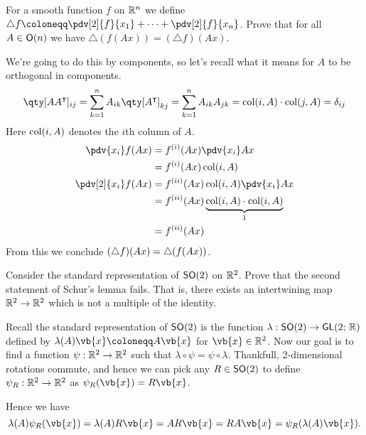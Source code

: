\documentclass[
	pages,
	boxes,
	color=WildStrawberry
]{homework}
\begin{document}
\begin{problem}
For a smooth function $f$ on $\mathbb{R}^n$ we define $\triangle f \defeq \pdv[2]{f}{x_1} + \cdots + \pdv[2]{f}{x_n}$. Prove that for all $A \in \mathsf{O}(n)$ we have $\triangle (f(Ax)) = (\triangle f)(Ax)$.
\end{problem}

\begin{solution}
	We're going to do this by components, so let's recall what it means for $A$ to be orthogonal in components.
	\begin{equation*}
		\qty[AA^{\intercal}]_{ij} = \sum_{k = 1}^{n}A_{ik}\qty[A^\intercal]_{kj} = \sum_{k = 1}^{n}A_{ik}A_{jk} = \col{i}{A}\cdot \col{j}{A} = \delta_{ij}
	\end{equation*}
	Here $\operatorname{col}(i, A)$ denotes the $i$th column of $A$.
	\begin{align*}
		\pdv{x_i}f(Ax)    & = f^{(i)}(Ax)\pdv{x_i}Ax                                 \\
		                  & = f^{(i)}(Ax)\col{i}{A}                                  \\
		\pdv[2]{x_i}f(Ax) & = f^{(ii)}(Ax)\col{i}{A}\pdv{x_i}Ax                      \\
		                  & = f^{(ii)}(Ax)\underbrace{\col{i}{A}\cdot\col{i}{A}}_{1} \\
		                  & = f^{(ii)}(Ax)
	\end{align*}
	From this we conclude $(\triangle{f})(Ax) = \triangle{(f(Ax))}$.
\end{solution}

\begin{problem}
Consider the standard representation of $\mathsf{SO}(2)$ on $\mathbb{R}^2$. Prove that the second statement of Schur's lemma fails. That is, there exists an intertwining map $\mathbb{R}^2 \to \mathbb{R}^2$ which is not a multiple of the identity.
\end{problem}

\begin{solution}
	Recall the standard representation of $\mathsf{SO}(2)$ is the function $\lambda:\mathsf{SO}(2)\to\mathsf{GL}(2;\, \mathbb{R})$ defined by $\lambda(A)\vb{x} \defeq A\vb{x}$ for $\vb{x}\in\R^2$. Now our goal is to find a function $\psi:\mathbb{R}^2\to\mathbb{R}^2$ such that $\lambda \circ \psi = \psi\circ \lambda$. Thankfull, 2-dimensional rotations commute, and hence we can pick any $R\in\mathsf{SO}(2)$ to define $\psi_R:\mathbb{R}^2\to \mathbb{R}^2$ as $\psi_R(\vb{x}) = R\vb{x}$.

	Hence we have
	\begin{equation*}
		\lambda(A)\psi_R(\vb{x}) = \lambda(A)R\vb{x} = AR\vb{x} = RA\vb{x} = \psi_R(\lambda(A)\vb{x}).
	\end{equation*}
\end{solution}
\end{document}
